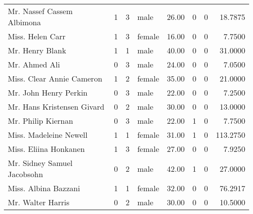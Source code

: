 \begin{tabular}{lrrlrrrr}
Mr. Nassef Cassem Albimona                         &         1 &       3 &    male &  26.00 &                        0 &                        0 &   18.7875 \\
Miss. Helen Carr                                   &         1 &       3 &  female &  16.00 &                        0 &                        0 &    7.7500 \\
Mr. Henry Blank                                    &         1 &       1 &    male &  40.00 &                        0 &                        0 &   31.0000 \\
Mr. Ahmed Ali                                      &         0 &       3 &    male &  24.00 &                        0 &                        0 &    7.0500 \\
Miss. Clear Annie Cameron                          &         1 &       2 &  female &  35.00 &                        0 &                        0 &   21.0000 \\
Mr. John Henry Perkin                              &         0 &       3 &    male &  22.00 &                        0 &                        0 &    7.2500 \\
Mr. Hans Kristensen Givard                         &         0 &       2 &    male &  30.00 &                        0 &                        0 &   13.0000 \\
Mr. Philip Kiernan                                 &         0 &       3 &    male &  22.00 &                        1 &                        0 &    7.7500 \\
Miss. Madeleine Newell                             &         1 &       1 &  female &  31.00 &                        1 &                        0 &  113.2750 \\
Miss. Eliina Honkanen                              &         1 &       3 &  female &  27.00 &                        0 &                        0 &    7.9250 \\
Mr. Sidney Samuel Jacobsohn                        &         0 &       2 &    male &  42.00 &                        1 &                        0 &   27.0000 \\
Miss. Albina Bazzani                               &         1 &       1 &  female &  32.00 &                        0 &                        0 &   76.2917 \\
Mr. Walter Harris                                  &         0 &       2 &    male &  30.00 &                        0 &                        0 &   10.5000 \\

\end{tabular}
